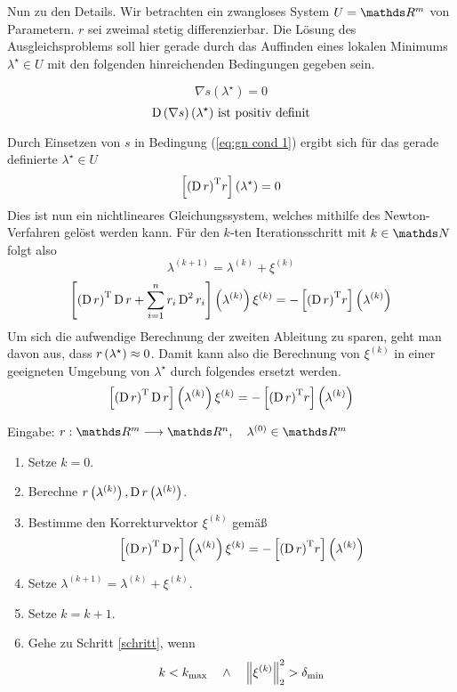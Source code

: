 			Nun zu den Details.
			Wir betrachten ein zwangloses System $U=\SR^m$ von Parametern.
			$r$ sei zweimal stetig differenzierbar.
			Die Lösung des Ausgleichsproblems soll hier gerade durch das Auffinden eines lokalen Minimums $\lambda^\star\in U$ mit den folgenden hinreichenden Bedingungen gegeben sein.
			\begin{tcolorbox}[title=Bedingungen für Minimum, top=0mm]
				\begin{equation}
				\label{eq:gn cond 1}
					\nabla s(\lambda^\star) = 0
				\end{equation}
				\begin{equation}
					\operatorname{\mathrm{D}}\left( \nabla s \right)(\lambda^\star) \text{ ist positiv definit}
				\end{equation}
			\end{tcolorbox}
			Durch Einsetzen von $s$ in Bedingung (\ref{eq:gn cond 1}) ergibt sich für das gerade definierte $\lambda^\star\in U$
			\[ \left[ {\left( \operatorname{\mathrm{D}} r \right)}^{\mathrm{T}}r \right]\left( \lambda^\star \right) = 0 \]
			Dies ist nun ein nichtlineares Gleichungssystem, welches mithilfe des Newton-Verfahren gelöst werden kann.
			Für den $k$-ten Iterationsschritt mit $k\in\SN$ folgt also
			\[ \lambda^{(k+1)} = \lambda^{(k)} + \xi^{(k)} \]
			\[ \left[  {\left( \operatorname{\mathrm{D}} r \right)}^{\mathrm{T}}\operatorname{\mathrm{D}} r + \sum_{i=1}^n r_i \operatorname{\mathrm{D}}^2r_i  \right]\left( \lambda^{(k)} \right) \xi^{(k)} = -\left[  {\left( \operatorname{\mathrm{D}} r \right)}^{\mathrm{T}}r  \right]\left( \lambda^{(k)} \right) \]
			Um sich die aufwendige Berechnung der zweiten Ableitung zu sparen, geht man davon aus, dass $r\left( \lambda^\star \right)\approx 0$.
			Damit kann also die Berechnung von $\xi^{(k)}$ in einer geeigneten Umgebung von $\lambda^\star$ durch folgendes ersetzt werden.
			\[ \left[  {\left( \operatorname{\mathrm{D}} r \right)}^{\mathrm{T}}\operatorname{\mathrm{D}} r  \right]\left( \lambda^{(k)} \right) \xi^{(k)} = -\left[  {\left( \operatorname{\mathrm{D}} r \right)}^{\mathrm{T}}r  \right]\left( \lambda^{(k)} \right) \]

			\begin{tcolorbox}[colframe=black,colbacktitle=white,coltitle=black, attach boxed title to top center={yshift=-2mm},enhanced, titlerule=0.1pt, boxrule=0.5pt, breakable, arc=5pt,title=Algorithmus:\quad Gauß-Newton-Verfahren]
				Eingabe: $r:\SR^m\longrightarrow\SR^n,\quad \lambda^{(0)}\in\SR^m$

				\begin{enumerate}[label=\normalfont (\arabic*)]
					\item Setze $k=0$.
					\item Berechne $r\left( \lambda^{(k)} \right), \operatorname{\mathrm{D}} r\left( \lambda^{(k)} \right)$.
					\label{schritt}
					\item Bestimme den Korrekturvektor $\xi^{(k)}$ gemäß
						\[ \left[  {\left( \operatorname{\mathrm{D}} r \right)}^{\mathrm{T}}\operatorname{\mathrm{D}} r  \right]\left( \lambda^{(k)} \right) \xi^{(k)} = -\left[  {\left( \operatorname{\mathrm{D}} r \right)}^{\mathrm{T}}r  \right]\left( \lambda^{(k)} \right) \]
					\item Setze $\lambda^{(k+1)} = \lambda^{(k)} + \xi^{(k)}$.
					\item Setze $k=k+1$.
					\item Gehe zu Schritt \ref{schritt}, wenn
						\[ k < k_{\mathrm{max}} \quad \wedge \quad \left\| \xi^{(k)} \right\|_2^2 > \delta_{\mathrm{min}} \]
				\end{enumerate}
			\end{tcolorbox}

